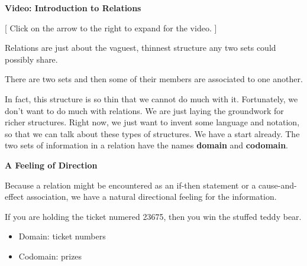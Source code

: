 \documentclass{ximera}
\begin{document}
\begin{explanation} \textbf{Video: Introduction to Relations}

[ Click on the arrow to the right to expand for the video. ]
\begin{expandable} 

\begin{center}
\end{center}

\end{expandable}
\end{explanation}





Relations are just about the vaguest, thinnest structure any two sets could possibly share. \\


\begin{center}
There are two sets and then some of their members are associated to one another. 
\end{center}


In fact, this structure is so thin that we cannot do much with it.  Fortunately, we don't want to do much with relations.  We are just laying the groundwork for richer structures.  Right now, we just want to invent some language and notation, so that we can talk about these types of structures. We have a start already. The two sets of information in a relation have the names \textbf{\textcolor{purple!85!blue}{domain}} and \textbf{\textcolor{purple!85!blue}{codomain}}.




\textbf{\textcolor{red!80!black}{A Feeling of Direction}}



Because a relation might be encountered as an if-then statement or a cause-and-effect association, we have a natural directional feeling for the information.  



\begin{idea}
If you are holding the ticket numered 23675, then you win the stuffed teddy bear. \\

\begin{itemize}
    \item Domain: ticket numbers
    \item Codomain: prizes
\end{itemize}

\end{idea}
\end{document}
